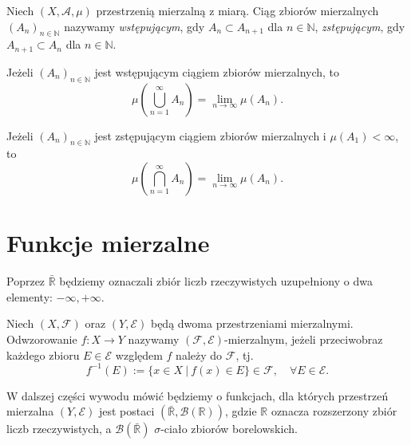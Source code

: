 	\begin{df}
		Niech  $(X, \mathcal{A}, \mu)$ przestrzenią mierzalną z miarą. Ciąg zbiorów mierzalnych $(A_n)_{n \in \mathbb{N}}$ nazywamy \textit{wstępującym}, gdy $A_n \subset A_{n+1}$ dla $n \in \mathbb{N}$, \textit{zstępującym}, gdy  $A_{n+1} \subset A_{n}$ dla $n \in \mathbb{N}$.  
	\end{df}
	
	\begin{tw}
		Jeżeli $(A_n)_{n \in \mathbb{N}}$ jest wstępującym ciągiem zbiorów mierzalnych, to 
		\begin{equation*}
			\mu \left( \bigcup_{n=1}^{\infty} A_n \right) = \lim_{n \rightarrow \infty } \mu(A_n).
		\end{equation*}

		Jeżeli $(A_n)_{n \in \mathbb{N}}$ jest zstępującym ciągiem zbiorów mierzalnych i $\mu(A_1) < \infty $, to 
		\begin{equation*}
		\mu \left( \bigcap_{n=1}^{\infty} A_n \right) = \lim_{n \rightarrow \infty } \mu(A_n).
		\end{equation*}
	\end{tw}
	
	\section{Funkcje mierzalne}
	Poprzez $\bar{\mathbb{R}}$ będziemy oznaczali zbiór liczb rzeczywistych uzupełniony o dwa elementy: $-\infty, +\infty$.
	\begin{df}
		Niech $(X, \mathcal{F})$ oraz $(Y, \mathcal{E})$ będą dwoma przestrzeniami mierzalnymi. Odwzorowanie $f:  X \rightarrow Y$ nazywamy $(\mathcal{F}, \mathcal{E})$-mierzalnym, jeżeli przeciwobraz każdego zbioru $E \in \mathcal{E}$ względem $f$ należy do $\mathcal{F}$, tj.
		\begin{equation*}
			f^{-1}(E) := \{ x \in X \: | \: f(x) \in E\} \in \mathcal{F}, \quad \forall E \in \mathcal{E}.
		\end{equation*}
	\end{df}		
	
	\begin{uwg}
		W dalszej części wywodu mówić będziemy o funkcjach, dla których przestrzeń mierzalna $(Y, \mathcal{E})$ jest postaci 	$(\bar{\mathbb{R}}, \mathcal{B}(\mathbb{R}))$, gdzie $\mathbb{R}$ oznacza rozszerzony zbiór liczb rzeczywistych, a $\mathcal{B}(\bar{\mathbb{R}})$  $\sigma$-ciało zbiorów borelowskich.
	\end{uwg}
	
